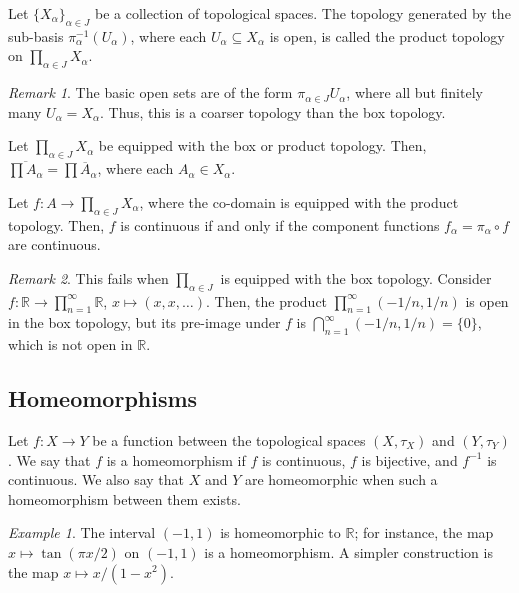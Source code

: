 \documentclass[11pt]{article}
\newcommand{\R}{\mathbb{R}}
\theoremstyle{definition}
\theoremstyle{remark}
\newtheorem*{remark}{Remark}
\newtheorem*{example}{Example}
\numberwithin{equation}{section}
\begin{document}
    \begin{definition}
        Let $\{X_\alpha\}_{\alpha \in J}$ be a collection of topological spaces. The
        topology generated by the sub-basis $\pi_\alpha^{-1}(U_\alpha)$, where each
        $U_\alpha \subseteq X_\alpha$ is open, is called the product
        topology on $\prod_{\alpha \in J} X_\alpha$.

        \begin{remark}
            The basic open sets are of the form $\pi_{\alpha \in J} U_\alpha$, where
            all but finitely many $U_\alpha = X_\alpha$. Thus, this is a coarser
            topology than the box topology.
        \end{remark}
    \end{definition}

    \begin{lemma}
        Let $\prod_{\alpha \in J}X_\alpha$ be equipped with the box or product
        topology. Then, $\overline{\prod A_\alpha} = \prod \overline{A}_\alpha$,
        where each $A_\alpha \in X_\alpha$.
    \end{lemma}
    
    \begin{lemma}
        Let $f\colon A \to \prod_{\alpha \in J} X_\alpha$, where the co-domain is
        equipped with the product topology. Then, $f$ is continuous if and only if
        the component functions $f_\alpha = \pi_\alpha\circ f$ are continuous.

        \begin{remark}
            This fails when $\prod_{\alpha \in J}$ is equipped with the box topology.
            Consider $f\colon \R \to \prod_{n = 1}^\infty \R$, $x \mapsto (x, x,
            \dots)$. Then, the product $\prod_{n = 1}^\infty (- 1 / n, 1 / n)$ is
            open in the box topology, but its pre-image under $f$ is $\bigcap_{n =
            1}^\infty (-1 / n, 1 / n) = \{0\}$, which is not open in $\R$.
        \end{remark}
    \end{lemma}
    

    \subsection{Homeomorphisms}

    \begin{definition}
        Let $f\colon X \to Y$ be a function between the topological spaces $(X,
        \tau_X)$ and $(Y, \tau_Y)$. We say that $f$ is a homeomorphism if $f$ is
        continuous, $f$ is bijective, and $f^{-1}$ is continuous. We also say that
        $X$ and $Y$ are homeomorphic when such a homeomorphism between them exists.
    \end{definition}
    \begin{example}
        The interval $(-1, 1)$ is homeomorphic to $\R$; for instance, the map $x
        \mapsto \tan(\pi x/ 2)$ on $(-1, 1)$ is a homeomorphism. A simpler
        construction is the map $x \mapsto x / (1 - x^2)$.
    \end{example}
\end{document}
